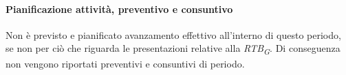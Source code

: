 \paragraph{Pianificazione attività, preventivo e consuntivo}
Non è previsto e pianificato avanzamento effettivo all’interno di questo periodo, se non per ciò che riguarda
le presentazioni relative alla \textit{RTB}\textsubscript{\textit{G}}.
Di conseguenza non vengono riportati preventivi e consuntivi di periodo.